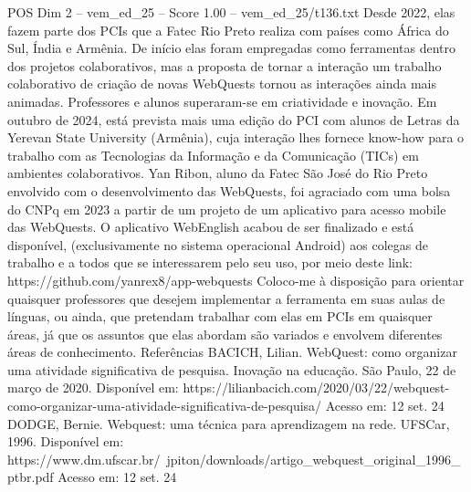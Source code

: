 \begin{textsample}{POS Dim 2 – vem\_ed\_25 – Score 1.00 – vem\_ed\_25/t136.txt}
Desde 2022, elas fazem parte dos PCIs que a Fatec Rio Preto realiza com países como África do Sul, Índia e Armênia.
De início elas foram empregadas como ferramentas dentro dos projetos colaborativos, mas a proposta de tornar a interação um trabalho colaborativo de criação de novas WebQuests tornou as interações ainda mais animadas.
Professores e alunos superaram-se em criatividade e inovação.
Em outubro de 2024, está prevista mais uma edição do PCI com alunos de Letras da Yerevan State University (Armênia), cuja interação lhes fornece know-how para o trabalho com as Tecnologias da Informação e da Comunicação (TICs) em ambientes colaborativos.
Yan Ribon, aluno da Fatec São José do Rio Preto envolvido com o desenvolvimento das WebQuests, foi agraciado com uma bolsa do CNPq em 2023 a partir de um projeto de um aplicativo para acesso mobile das WebQuests.
O aplicativo WebEnglish acabou de ser finalizado e está disponível, (exclusivamente no sistema operacional Android) aos colegas de trabalho e a todos que se interessarem pelo seu uso, por meio deste link: https://github.com/yanrex8/app-webquests Coloco-me à disposição para orientar quaisquer professores que desejem implementar a ferramenta em suas aulas de línguas, ou ainda, que pretendam trabalhar com elas em PCIs em quaisquer áreas, já que os assuntos que elas abordam são variados e envolvem diferentes áreas de conhecimento.
Referências BACICH, Lilian.
WebQuest: como organizar uma atividade significativa de pesquisa.
Inovação na educação.
São Paulo, 22 de março de 2020.
Disponível em: https://lilianbacich.com/2020/03/22/webquest-como-organizar-uma-atividade-significativa-de-pesquisa/ Acesso em: 12 set. 24 DODGE, Bernie.
Webquest: uma técnica para aprendizagem na rede.
UFSCar, 1996.
Disponível em: https://www.dm.ufscar.br/~jpiton/downloads/artigo\_webquest\_original\_1996\_ptbr.pdf Acesso em: 12 set. 24

\end{textsample}
